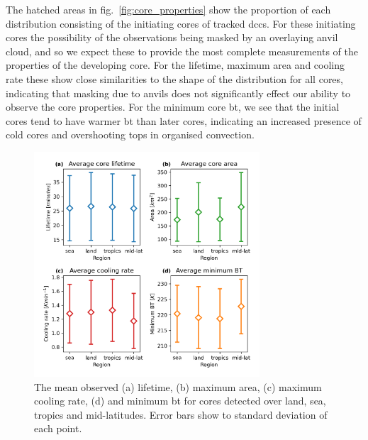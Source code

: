 The hatched areas in fig.~\ref{fig:core_properties} show the proportion of each distribution consisting of the initiating cores of tracked \acrshort{dcc}s.
For these initiating cores the possibility of the observations being masked by an overlaying anvil cloud, and so we expect these to provide the most complete measurements of the properties of the developing core.
For the lifetime, maximum area and cooling rate these show close similarities to the shape of the distribution for all cores, indicating that masking due to anvils does not significantly effect our ability to observe the core properties.
For the minimum core \acrshort{bt}, we see that the initial cores tend to have warmer \acrshort{bt} than later cores, indicating an increased presence of cold cores and overshooting tops in organised convection.

\begin{figure}[tp]
    \centering
    \includegraphics[width=0.75\textwidth]{figures/chapter2_09.png}
    \caption[
    The mean observed lifetimes, maximum areas, cooling rates and \acrshort{bt} for cores detected over land, sea, tropics and mid-latitudes
    ]{
    The mean observed (a) lifetime, (b) maximum area, (c) maximum cooling rate, (d) and minimum \acrshort{bt} for cores detected over land, sea, tropics and mid-latitudes. Error bars show to standard deviation of each point.
    }
    \label{fig:core_region_mean_properties}
\end{figure}

